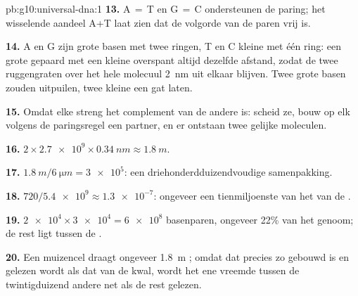 \begin{solution}{pb:g10:universal-dna:1}
\textbf{13.} A$\,=\,$T en G$\,=\,$C ondersteunen de paring; het
wisselende aandeel A+T laat zien dat de volgorde van de paren vrij is.

\textbf{14.} A en G zijn grote basen met twee ringen, T en C kleine met
één ring: een grote gepaard met een kleine overspant altijd dezelfde
afstand, zodat de twee ruggengraten over het hele molecuul \qty{2}{nm}
uit elkaar blijven. Twee grote basen zouden uitpuilen, twee kleine een
gat laten.

\textbf{15.} Omdat elke streng het complement van de andere is: scheid
ze, bouw op elk volgens de paringsregel een partner, en er ontstaan twee
gelijke moleculen.

\textbf{16.} $2 \times \num{2.7e9} \times \qty{0.34}{nm} \approx
\qty{1.8}{m}$.

\textbf{17.} $\qty{1.8}{m} / \qty{6}{\micro m} = \num{3e5}$: een
driehonderdduizendvoudige samenpakking.

\textbf{18.} $720 / \num{5.4e9} \approx \num{1.3e-7}$: ongeveer een
tienmiljoenste van het  van de .

\textbf{19.} $\num{2e4} \times \num{3e4} = \num{6e8}$ basenparen,
ongeveer 22\% van het genoom; de rest ligt tussen de .

\textbf{20.} Een muizencel draagt ongeveer \qty{1.8}{m} ; omdat dat
 precies zo gebouwd is en gelezen wordt als dat van de kwal, wordt
het ene vreemde  tussen de twintigduizend andere net als de rest
gelezen.
\end{solution}
